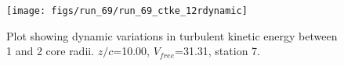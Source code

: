 \begin{figure}[H]
\centering
\texttt{[image: figs/run\_69/run\_69\_ctke\_12rdynamic]}
\caption{Plot showing dynamic variations in turbulent kinetic energy between 1 and 2 core radii. $z/c$=10.00, $V_{free}$=31.31, station 7.}
\label{fig:run_69_ctke_12rdynamic}
\end{figure}


